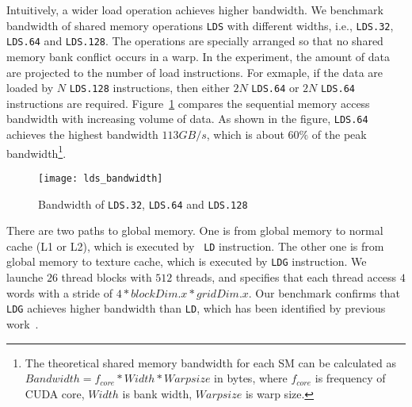 Intuitively, a wider load operation achieves higher bandwidth. We benchmark bandwidth of shared memory operations {\tt LDS} with different widths, i.e., {\tt LDS.32}, {\tt LDS.64}
and {\tt LDS.128}. The operations are specially arranged so that no shared memory bank conflict occurs in a warp. In the
experiment, the amount of data are projected to the number of load instructions. For exmaple, if the data are loaded by
$N$ {\tt LDS.128} instructions, then either $2N$ {\tt LDS.64} or $2N$ {\tt LDS.64} instructions are required.
Figure~\ref{fig:lds_bw} compares the sequential memory access bandwidth with increasing volume of data. As shown in the figure, {\tt LDS.64} achieves the highest bandwidth $113GB/s$, which is about $60\%$ of the peak bandwidth\footnote{The theoretical shared memory bandwidth for each SM can be calculated as $Bandwidth=f_{core}*Width*Warpsize$ in
bytes, where $f_{core}$ is frequency of CUDA core, $Width$ is bank width, $Warpsize$ is warp size.}.

\begin{figure}[htbp]
\begin{center}
\texttt{[image: lds\_bandwidth]}
    \caption{ Bandwidth of {\tt LDS.32}, {\tt LDS.64} and {\tt LDS.128}}
\label{fig:lds_bw}
\end{center}
\end{figure}

There are two paths to global memory. One is from global memory to normal cache (L1 or L2), which is executed by {\tt
LD} instruction. The other one is from global memory to texture cache, which is executed by {\tt LDG} instruction. We
launche $26$ thread blocks with $512$ threads, and specifies that each thread access $4$ words with a stride of
$4*blockDim.x*gridDim.x$. Our benchmark confirms that {\tt LDG} achieves higher bandwidth than {\tt LD}, which has been
identified by previous work~\cite{tan}.

